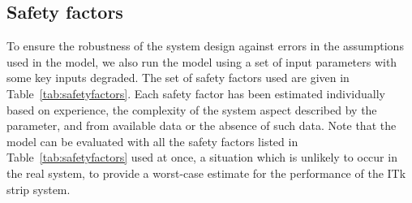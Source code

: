 \subsection{Safety factors}
\label{sec:safety_factors}
To ensure the robustness of the system design against errors in the assumptions used in the model, we also run the model using a set of input parameters with some key inputs degraded. The set of safety factors used are given in Table~\ref{tab:safetyfactors}. Each safety factor has been estimated individually based on experience, the complexity of the system aspect described by the parameter, and from available data or the absence of such data. Note that the model can be evaluated with all the safety factors listed in Table~\ref{tab:safetyfactors} used at once, a situation which is unlikely to occur in the real system, to provide a worst-case estimate for the performance of the ITk strip system.

\let\arraystretcha\arraystretch %
\renewcommand\arraystretch{1.2} %
\begin{table}[htb]
\caption{Safety factors.}
\label{tab:safetyfactors}
\centering
{} %
\end{table}
\let\arraystretch\arraystretcha %

